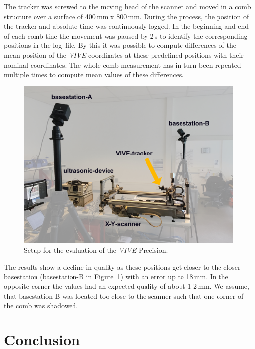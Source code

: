 \documentclass{VRARWorkshop}
\begin{document}
The tracker was screwed to the moving head of the scanner and moved in a comb structure over a surface of 400\,mm x 800\,mm.
During the process, the position of the tracker and absolute time was continuously logged.
In the beginning and end of each comb tine the movement was paused by 2\,s to identify the corresponding positions in the log--file.
By this it was possible to compute differences of the mean position of the
\textit{VIVE} coordinates at these predefined positions with their nominal coordinates. 
The whole comb measurement has in turn been repeated multiple times to compute mean values of these differences.

\begin{figure}[h!]
    \begin{center}
        \includegraphics[width=120mm]{images/PrecisionMeasurement}
        \caption{\label{fig:precisionMeasurementSetup} Setup for the evaluation of the \textit{VIVE}-Precision.}
    \end{center}
\end{figure}

The results show a decline in quality as these positions get closer to the closer basestation (basestation-B in Figure~\ref{fig:precisionMeasurementSetup}) with an error up to 18\,mm.
In the opposite corner the values had an expected quality of about 1-2\,mm.
We assume, that basestation-B was located too close to the scanner such that one corner of the comb was shadowed.

\section{Conclusion}
\end{document}
